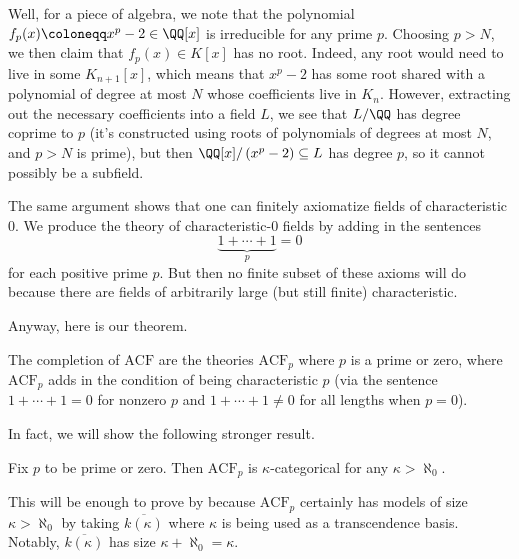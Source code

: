\documentclass[../notes.tex]{subfiles}
\begin{document}
Well, for a piece of algebra, we note that the polynomial $f_p(x)\coloneqq x^p-2\in\QQ[x]$ is irreducible for any prime $p$. Choosing $p>N$, we then claim that $f_p(x)\in K[x]$ has no root. Indeed, any root would need to live in some $K_{n+1}[x]$, which means that $x^p-2$ has some root shared with a polynomial of degree at most $N$ whose coefficients live in $K_n$. However, extracting out the necessary coefficients into a field $L$, we see that $L/\QQ$ has degree coprime to $p$ (it's constructed using roots of polynomials of degrees at most $N$, and $p>N$ is prime), but then $\QQ[x]/\left(x^p-2\right)\subseteq L$ has degree $p$, so it cannot possibly be a subfield.\todo{}
\begin{remark}
	The same argument shows that one can finitely axiomatize fields of characteristic $0$. We produce the theory of characteristic-$0$ fields by adding in the sentences
	\[\underbrace{1+\cdots+1}_p=0\]
	for each positive prime $p$. But then no finite subset of these axioms will do because there are fields of arbitrarily large (but still finite) characteristic.
\end{remark}
Anyway, here is our theorem.
\begin{theorem} \label{thm:complete-acf}
	The completion of $\mathrm{ACF}$ are the theories $\mathrm{ACF}_p$ where $p$ is a prime or zero, where $\mathrm{ACF}_p$ adds in the condition of being characteristic $p$ (via the sentence $1+\cdots+1=0$ for nonzero $p$ and $1+\cdots+1\ne0$ for all lengths when $p=0$).
\end{theorem}
In fact, we will show the following stronger result.
\begin{theorem} \label{thm:acf-p-categorical}
	Fix $p$ to be prime or zero. Then $\mathrm{ACF}_p$ is $\kappa$-categorical for any $\kappa>\aleph_0$.
\end{theorem}
This will be enough to prove  by  because $\mathrm{ACF}_p$ certainly has models of size $\kappa>\aleph_0$ by taking $\overline{k(\kappa)}$ where $\kappa$ is being used as a transcendence basis. Notably, $\overline{k(\kappa)}$ has size $\kappa+\aleph_0=\kappa$.
\end{document}
